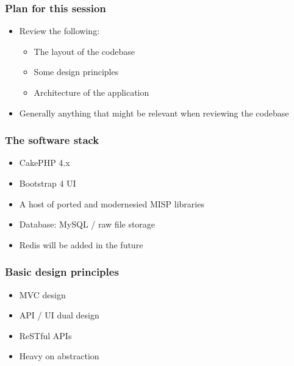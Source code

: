 
\begin{frame}[t,plain]
\titlepage
\end{frame}

\begin{frame}
	\frametitle{Plan for this session}
	\begin{itemize}
            \item Review the following:
            \begin{itemize}
		\item The layout of the codebase
                \item Some design principles
                \item Architecture of the application
            \end{itemize}
            \item Generally anything that might be relevant when reviewing the codebase
	\end{itemize}
\end{frame}

\begin{frame}
	\frametitle{The software stack}
	\begin{itemize}
                \item CakePHP 4.x
                \item Bootstrap 4 UI
                \item A host of ported and modernesied MISP libraries
                \item Database: MySQL / raw file storage
                \item Redis will be added in the future
	\end{itemize}
\end{frame}

\begin{frame}
	\frametitle{Basic design principles}
	\begin{itemize}
		\item MVC design
                \item API / UI dual design
                \item ReSTful APIs
                \item Heavy on abstraction
	\end{itemize}
\end{frame}

